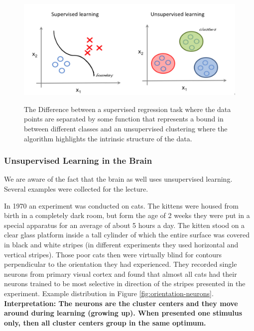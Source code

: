 \documentclass[main]{subfiles}
\begin{document}
\begin{figure}[H]
	\centering
	\includegraphics[width=0.99\linewidth]{07_UnsupervisedAndSelfsupervisedLearning/figures/sup-unsup-comp.png}
	\label{fig:sup-unsup-comp}
	\caption{The Difference between a supervised regression task where the data points are separated by some function that represents a bound in between different classes and an unsupervised clustering where the algorithm highlights the intrinsic structure of the data.}
\end{figure}

\subsubsection{Unsupervised Learning in the Brain}
We are aware of the fact that the brain as well uses unsupervised learning. Several examples were collected for the lecture.

In 1970 an experiment was conducted on cats. The kittens were housed from birth in a completely dark room, but form the age of 2 weeks they were put in a special apparatus for an average of about 5 hours a day. The kitten stood on a clear glass platform inside a tall cylinder of which the entire surface was covered in black and white stripes (in different experiments they used horizontal and vertical stripes). Those poor cats then were virtually blind for contours perpendicular to the orientation they had experienced. They recorded single neurons from primary visual cortex and found that almost all cats had their neurons trained to be most selective in direction of the stripes presented in the experiment. Example distribution in Figure \cref{fig:orientation-neurons}. \textbf{Interpretation: The neurons are the cluster centers and they move around during learning (growing up). When presented one stimulus only, then all cluster centers group in the same optimum.}
\end{document}
